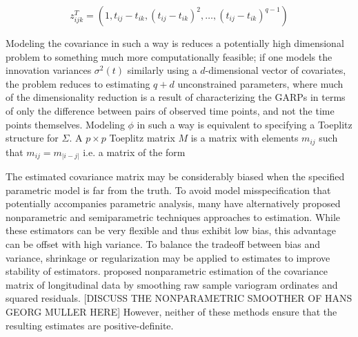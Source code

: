 \documentclass[12pt]{article}
\theoremstyle{definition}
\begin{document}
{{\begin{equation}
z_{ijk}^T = \left(1, t_{ij} - t_{ik},\left( t_{ij} - t_{ik} \right)^2, \dots, \left(t_{ij} - t_{ik}\right)^{q-1} \right) \label{covmodel}
\end{equation}

Modeling the covariance in such a way is reduces a potentially high dimensional problem to something much more computationally feasible; if one models the innovation variances $\sigma^2\left(t\right)$ similarly using a $d$-dimensional vector of covariates, the problem reduces to estimating $q+d$ unconstrained parameters, where much of the dimensionality reduction is a result of characterizing the GARPs in terms of only the difference between pairs of observed time points, and not the time points themselves.  Modeling $\phi$ in such a way is equivalent to specifying a Toeplitz structure for $\Sigma$. A $p \times p$ Toeplitz matrix $M$ is a matrix with elements $m_{ij}$ such that $m_{ij} = m_{\vert i-j \vert}$ i.e. a matrix of the form


\bigskip

The estimated covariance matrix may be considerably biased when the specified parametric model is far from the truth.  To avoid model misspecification that potentially accompanies parametric analysis, many have alternatively  proposed nonparametric and semiparametric techniques approaches to estimation.  While these estimators can be very flexible and thus exhibit low bias, this advantage can be offset with high variance.  To balance the tradeoff between bias and variance, shrinkage or regularization may be applied to estimates to improve stability of estimators. \citet{diggle1998nonparametric} proposed nonparametric estimation of the covariance matrix of longitudinal data by smoothing raw sample variogram ordinates and squared residuals.  [DISCUSS THE NONPARAMETRIC SMOOTHER OF HANS GEORG MULLER HERE]  However, neither of these methods ensure that the resulting estimates are positive-definite.  

}}
\end{document}

